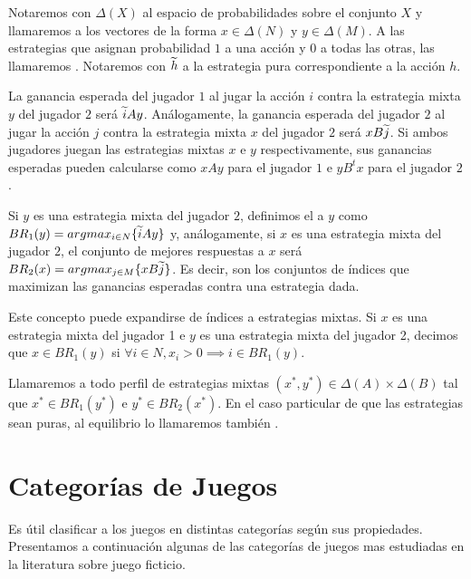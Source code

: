 

Notaremos con $\Delta(X)$ al espacio de probabilidades sobre el conjunto $X$ y llamaremos  a los vectores de la forma $x \in \Delta(N)$ y $y \in \Delta(M)$. A las estrategias que asignan probabilidad $1$ a una acción y $0$ a todas las otras, las llamaremos . Notaremos con $\widetilde{h}$ a la estrategia pura correspondiente a la acción $h$.

La ganancia esperada del jugador $1$ al jugar la acción $i$ contra la estrategia mixta $y$ del jugador $2$ será $\widetilde{i}Ay$. Análogamente, la ganancia esperada del jugador $2$ al jugar la acción $j$ contra la estrategia mixta $x$ del jugador $2$ será $xB\widetilde{j}$. Si ambos jugadores juegan las estrategias mixtas $x$ e $y$ respectivamente, sus ganancias esperadas pueden calcularse como $xAy$ para el jugador $1$ e $yB^tx$ para el jugador $2$.

Si $y$ es una estrategia mixta del jugador $2$, definimos el  a $y$ como $BR_1(y) = argmax_{i \in N}\{\widetilde{i}Ay\}$ y, análogamente, si $x$ es una estrategia mixta del jugador $2$, el conjunto de mejores respuestas a $x$ será $BR_2(x) = argmax_{j \in M}\{xB\widetilde{j}\}$. Es decir, son los conjuntos de índices que maximizan las ganancias esperadas contra una estrategia dada.

Este concepto puede expandirse de índices a estrategias mixtas. Si $x$ es una estrategia mixta del jugador 1 e $y$ es una estrategia mixta del jugador 2, decimos que $x \in BR_1(y)$ si $\forall i \in N, x_i > 0 \implies i \in BR_1(y)$.

Llamaremos  a todo perfil de estrategias mixtas $(x^*, y^*) \in \Delta(A) \times \Delta(B)$ tal que $x^* \in BR_1(y^*)$ e $y^* \in BR_2(x^*)$. En el caso particular de que las estrategias sean puras, al equilibrio lo llamaremos también .

\section{Categorías de Juegos}

Es útil clasificar a los juegos en distintas categorías según sus propiedades. Presentamos a continuación algunas de las categorías de juegos mas estudiadas en la literatura sobre juego ficticio.

